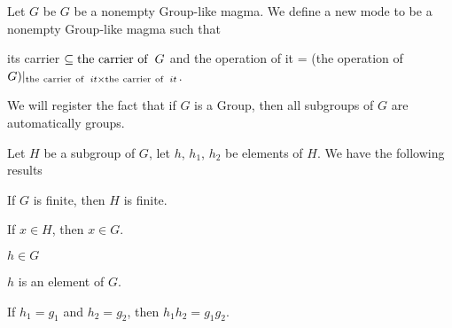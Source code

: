 \documentclass{article}
\begin{document}
\begin{definition}
Let $G$ be $G$ be a nonempty Group-like magma.
We define a new mode  to be a nonempty
Group-like magma such that
\begin{defn}
\item its carrier $\subseteq\operatorname{the\ carrier\ of\ }G$ and the operation of it = (the
  operation of $G)|_{\operatorname{the\ carrier\ of\ }it\times\operatorname{the\ carrier\ of\ }it}$.
\end{defn}
\end{definition}

\begin{remark}
We will register the fact that if $G$ is a Group, then all subgroups of
$G$ are automatically groups.
\end{remark}

Let $H$ be a subgroup of $G$, let $h$, $h_{1}$, $h_{2}$ be elements of $H$.
We have the following results
\begin{thm}
\item\label{group2:39} If $G$ is finite, then $H$ is finite.
\item\label{group2:40} If $x\in H$, then $x\in G$.
\item\label{group2:41} $h\in G$
\item\label{group2:42} $h$ is an element of $G$.
\item\label{group2:43} If $h_{1}=g_{1}$ and $h_{2}=g_{2}$, then $h_{1}h_{2}=g_{1}g_{2}$.
\end{thm}
\end{document}
